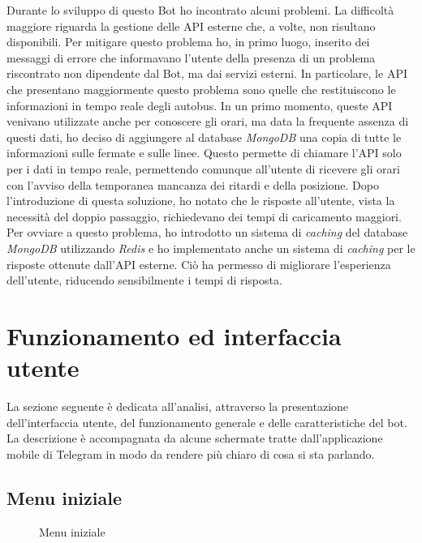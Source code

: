 Durante lo sviluppo di questo Bot ho incontrato alcuni problemi. La difficoltà maggiore riguarda la gestione delle API esterne che, a volte, non risultano disponibili. Per mitigare questo problema ho, in primo luogo, inserito dei messaggi di errore che informavano l'utente della presenza di un problema riscontrato non dipendente dal Bot, ma dai servizi esterni. 
In particolare, le API che presentano maggiormente questo problema sono quelle che restituiscono le informazioni in tempo reale degli autobus. In un primo momento, queste API venivano utilizzate anche per conoscere gli orari, ma data la frequente assenza di questi dati, ho deciso di aggiungere al database \textit{MongoDB} una copia di tutte le informazioni sulle fermate e sulle linee. Questo permette di chiamare l'API solo per i dati in tempo reale, permettendo comunque all'utente di ricevere gli orari con l'avviso della temporanea mancanza dei ritardi e della posizione. 
Dopo l'introduzione di questa soluzione, ho notato che le risposte all'utente, vista la necessità del doppio passaggio, richiedevano dei tempi di caricamento maggiori. Per ovviare a questo problema, ho introdotto un sistema di \textit{caching} del database \textit{MongoDB} utilizzando \textit{Redis} e ho implementato anche un sistema di \textit{caching} per le risposte ottenute dall'API esterne. Ciò ha permesso di migliorare l'esperienza dell'utente, riducendo sensibilmente i tempi di risposta. 

\newpage

\section{Funzionamento ed interfaccia utente}
\label{sec:funzionamento}

La sezione seguente è dedicata all'analisi, attraverso la presentazione dell'interfaccia utente, del funzionamento generale e delle caratteristiche del bot. La descrizione è accompagnata da alcune schermate tratte dall'applicazione mobile di Telegram in modo da rendere più chiaro di cosa si sta parlando.

\subsection{Menu iniziale}

\begin{wrapfigure}{r}{0.45\textwidth}
\centering
{}
\caption{Menu iniziale}
\label{fig:bot-menu-iniziale}
\end{wrapfigure}


